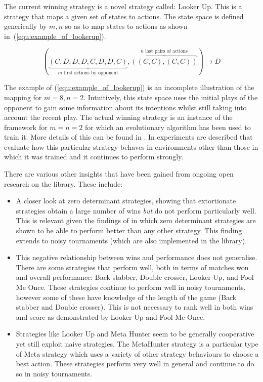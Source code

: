 \documentclass{article}
\begin{document}
The current winning strategy is a novel strategy called: Looker Up. This is a
strategy that maps a given set of states to actions. The state space is defined
generically by \(m, n\) so as to map states to actions as shown
in~(\ref{equ:example_of_lookerup}).

\begin{equation}
	(\underbrace{(C, D, D, D, C, D, D, C)}_{m\text{ first actions by opponent}},
	\overbrace{((C, C), (C, C))}^{n\text{ last pairs of actions}}) \to D
	\label{equ:example_of_lookerup}
\end{equation}

The example of (\ref{equ:example_of_lookerup}) is an incomplete illustration of
the mapping for \(m=8, n=2\). Intuitively, this state space uses the initial
plays of the opponent to gain some information about its intentions whilst still
taking into account the recent play. The actual winning strategy is an instance
of the framework for \(m=n=2\) for which an evolutionary algorithm has been used
to train it.  More details of this can be found in \cite{Jones2015}. In
\cite{Knight2015} experiments are described that evaluate how this particular
strategy behaves in environments other than those in which it was trained and it
continues to perform strongly.

There are various other insights that have been gained from ongoing open
research on the library. These include:

\begin{itemize}
    \item A closer look at zero determinant strategies, showing that
        extortionate strategies obtain a large number of wins \textit{but} do
        not perform particularly well. This is relevant given the findings of
        \cite{Stewart2012} in which zero determinant strategies are shown to be
        able to perform better than any other strategy. This finding extends
        to noisy tournaments (which are also implemented in the library).
    \item This negative relationship between wins and performance does not
        generalise. There are some strategies that perform well, both in terms
        of matches won and overall performance: Back stabber, Double crosser,
        Looker Up, and Fool Me Once. These strategies continue to perform well in noisy
        tournaments, however some of these have knowledge of the length of the
        game (Back stabber and Double crosser). This is not necessary to rank
        well in both wins and score as demonstrated by Looker Up and Fool Me
        Once.
    \item Strategies like Looker Up and Meta Hunter seem to be generally
        cooperative yet still exploit naive strategies. The MetaHunter strategy
        is a particular type of Meta strategy which uses a variety of other
        strategy behaviours to choose a best action. These strategies perform
        very well in general and continue to do so in noisy tournaments.
\end{itemize}
\end{document}
